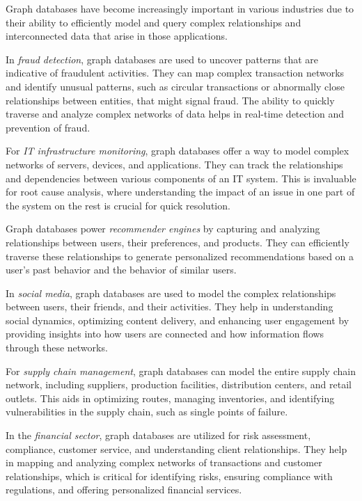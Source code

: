 Graph databases have become increasingly important in various industries due to their ability to efficiently model and query complex relationships and interconnected data that arise in those applications. 

In \emph{fraud detection}, graph databases are used to uncover patterns that are indicative of fraudulent activities. They can map complex transaction networks and identify unusual patterns, such as circular transactions or abnormally close relationships between entities, that might signal fraud. The ability to quickly traverse and analyze complex networks of data helps in real-time detection and prevention of fraud.

For \emph{IT infrastructure monitoring}, graph databases offer a way to model complex networks of servers, devices, and applications. They can track the relationships and dependencies between various components of an IT system. This is invaluable for root cause analysis, where understanding the impact of an issue in one part of the system on the rest is crucial for quick resolution.

Graph databases power \emph{recommender engines} by capturing and analyzing relationships between users, their preferences, and products. They can efficiently traverse these relationships to generate personalized recommendations based on a user's past behavior and the behavior of similar users.

In \emph{social media}, graph databases are used to model the complex relationships between users, their friends, and their activities. They help in understanding social dynamics, optimizing content delivery, and enhancing user engagement by providing insights into how users are connected and how information flows through these networks.

For \emph{supply chain management}, graph databases can model the entire supply chain network, including suppliers, production facilities, distribution centers, and retail outlets. This aids in optimizing routes, managing inventories, and identifying vulnerabilities in the supply chain, such as single points of failure.

In the \emph{financial sector}, graph databases are utilized for risk assessment, compliance, customer service, and understanding client relationships. They help in mapping and analyzing complex networks of transactions and customer relationships, which is critical for identifying risks, ensuring compliance with regulations, and offering personalized financial services.

